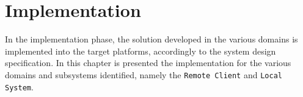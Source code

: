 \chapter{Implementation}
\label{cha:implementation}
In the implementation phase, the solution developed in the various domains is
implemented into the target platforms, accordingly to the system design
specification. In this chapter is presented the implementation for the various
domains and subsystems identified, namely the \texttt{Remote Client} and
\texttt{Local System}.


